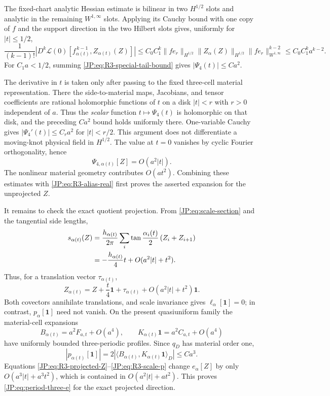 The fixed-chart analytic Hessian estimate is bilinear in two
$H^{1/2}$ slots and analytic in the remaining
$W^{1,\infty}$ slots.  Applying its Cauchy bound with one copy of $f$
and the support direction in the two Hilbert slots gives, uniformly for
$|t|\le1/2$,
\begin{equation}\label{JP:eq:R3-special-tail-bound}
 \frac1{(k-1)!}
 \left|D^k\mathcal L(0)
 [f_{\alpha(t)}^{\,k-1},Z_{\alpha(t)}(Z)]\right|
 \le C_0C_1^k
 \|f e_r\|_{H^{1/2}}\|Z_\alpha(Z)\|_{H^{1/2}}
 \|f e_r\|_{W^{1,\infty}}^{k-2}
 \le C_0C_1^k a^{k-2}.
\end{equation}
For $C_1a<1/2$, summing \eqref{JP:eq:R3-special-tail-bound} gives
$|\Psi_4(t)|\le Ca^2$.

The derivative in $t$ is taken only after passing to the fixed
three-cell material representation.  There the side-to-material maps,
Jacobians, and tensor coefficients are rational holomorphic functions of
$t$ on a disk $|t|<r$ with $r>0$ independent of $a$.  Thus the
\emph{scalar} function $t\mapsto\Psi_4(t)$ is holomorphic on that disk,
and the preceding $Ca^2$ bound holds uniformly there.  One-variable
Cauchy gives $|\Psi_4'(t)|\le C_ra^2$ for $|t|<r/2$.  This argument does
not differentiate a moving-knot physical field in $H^{1/2}$.
The value at $t=0$ vanishes by cyclic Fourier orthogonality, hence
\[
 \Psi_{4,\alpha(t)}[Z]=O(a^2|t|).
\]
The nonlinear material geometry contributes $O(at^2)$.  Combining these
estimates with \eqref{JP:eq:R3-alias-real} first proves the asserted
expansion for the unprojected $Z$.

It remains to check the exact quotient projection.  From
\eqref{JP:eq:scale-section} and the tangential side lengths,
\begin{align}
 s_{\alpha(t)}(Z)
 &=\frac{h_{\alpha(t)}}{2\pi}
 \sum_i\tan\frac{\alpha_i(t)}2\,(Z_i+Z_{i+1})\notag\\
 &=-\frac{h_{\alpha(t)}}4t+O(a^2|t|+t^2).
 \label{JP:eq:R3-scale-projection}
\end{align}
Thus, for a translation vector $\tau_{\alpha(t)}$,
\begin{equation}\label{JP:eq:R3-projected-Z}
 Z_{\alpha(t)}
 =Z+\frac t4\mathbf1+\tau_{\alpha(t)}
   +O(a^2|t|+t^2)\mathbf1.
\end{equation}
Both covectors annihilate translations, and scale invariance gives
$\ell_\alpha[\mathbf1]=0$; in contrast, $p_\alpha[\mathbf1]$ need not
vanish.  On the present quasiuniform family the material-cell expansions
\[
 B_{\alpha(t)}=a^2F_{a,t}+O(a^4),\qquad
 K_{\alpha(t)}\mathbf1=a^2C_{a,t}+O(a^4)
\]
have uniformly bounded three-periodic profiles.  Since $q_D$ has
material order one,
\begin{equation}\label{JP:eq:R3-scale-p}
 |p_{\alpha(t)}[\mathbf1]|
 =2|\langle B_{\alpha(t)},K_{\alpha(t)}\mathbf1\rangle_D|
 \le Ca^3.
\end{equation}
Equations \eqref{JP:eq:R3-projected-Z}--\eqref{JP:eq:R3-scale-p} change
$e_\alpha[Z]$ by only $O(a^3|t|+a^3t^2)$, which is contained in
$O(a^2|t|+at^2)$.  This proves \eqref{JP:eq:period-three-e} for the exact
projected direction.

